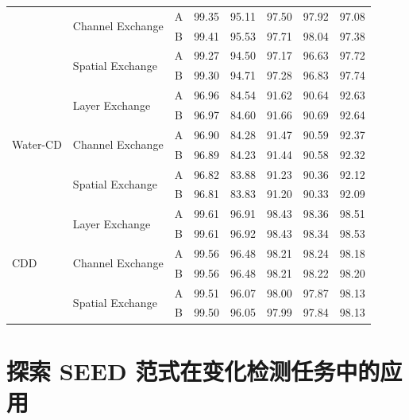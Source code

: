 \begin{table}[!htb]
\begin{tabularx}{\textwidth}{l X c X X X X X}
            \cline{2-8}
            & \multirow{2}{*}{Channel Exchange} & A & 99.35 & 95.11 & 97.50 & 97.92 & 97.08 \\
            &                                   & B & 99.41 & 95.53 & 97.71 & 98.04 & 97.38 \\
            \cline{2-8}
            & \multirow{2}{*}{Spatial Exchange} & A & 99.27 & 94.50 & 97.17 & 96.63 & 97.72 \\
            &                                   & B & 99.30 & 94.71 & 97.28 & 96.83 & 97.74 \\
        \hline
        \multirow{6}{*}{Water-CD}
            & \multirow{2}{*}{Layer Exchange}   & A & 96.96 & 84.54 & 91.62 & 90.64 & 92.63 \\
            &                                   & B & 96.97 & 84.60 & 91.66 & 90.69 & 92.64 \\
            \cline{2-8}
            & \multirow{2}{*}{Channel Exchange} & A & 96.90 & 84.28 & 91.47 & 90.59 & 92.37 \\
            &                                   & B & 96.89 & 84.23 & 91.44 & 90.58 & 92.32 \\
            \cline{2-8}
            & \multirow{2}{*}{Spatial Exchange} & A & 96.82 & 83.88 & 91.23 & 90.36 & 92.12 \\
            &                                   & B & 96.81 & 83.83 & 91.20 & 90.33 & 92.09 \\
        \hline
        \multirow{6}{*}{CDD}
            & \multirow{2}{*}{Layer Exchange}   & A & 99.61 & 96.91 & 98.43 & 98.36 & 98.51 \\
            &                                   & B & 99.61 & 96.92 & 98.43 & 98.34 & 98.53 \\
            \cline{2-8}
            & \multirow{2}{*}{Channel Exchange} & A & 99.56 & 96.48 & 98.21 & 98.24 & 98.18 \\
            &                                   & B & 99.56 & 96.48 & 98.21 & 98.22 & 98.20 \\
            \cline{2-8}
            & \multirow{2}{*}{Spatial Exchange} & A & 99.51 & 96.07 & 98.00 & 97.87 & 98.13 \\
            &                                   & B & 99.50 & 96.05 & 97.99 & 97.84 & 98.13 \\
        \hline
    \end{tabularx}
\end{table}

\section{探索 SEED 范式在变化检测任务中的应用}  

